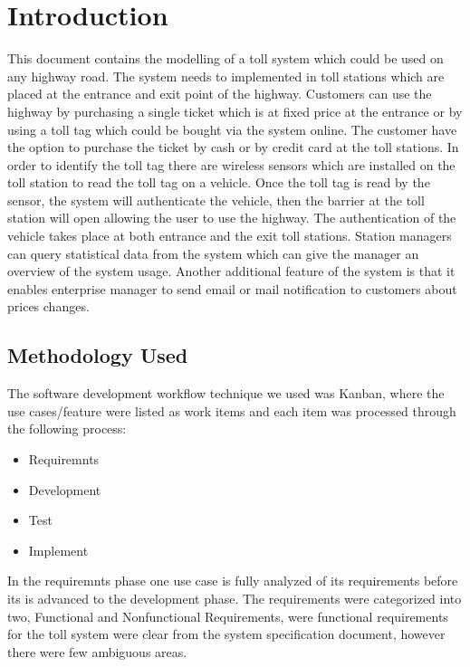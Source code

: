 \chapter{Introduction}
\noindent
This document contains the modelling of a toll system which could be used on any highway road. The system needs to implemented in toll stations which are placed at the entrance and exit point of the highway. Customers can use the highway by purchasing a single ticket which is at fixed price at the entrance or by using a toll tag which could be bought via the system online. The customer have the option to purchase the ticket by cash or by credit card at the toll stations. In order to identify the toll tag there are wireless sensors which are installed on the toll station to read the toll tag on a vehicle. Once the toll tag is read by the sensor, the system will authenticate the vehicle, then the barrier at the toll station will open allowing the user to use the highway. The authentication of the vehicle takes place at both entrance and the exit toll stations. Station managers can query statistical data from the system which can give the manager an overview of the system usage. Another additional feature of the system is that it enables enterprise manager to send email or mail notification to customers about prices changes.
\section{Methodology Used}

The software development workflow technique we used was Kanban, where the use cases/feature were listed as work items and each item was processed through the following process:

\begin{itemize}
  \item Requiremnts 
  \item Development
  \item Test
  \item Implement
\end{itemize}


In the requiremnts phase one use case is fully analyzed of its requirements before its is advanced to the development phase. The requirements were categorized into two, Functional and Nonfunctional Requirements, were functional requirements for the toll system were clear from the system specification document, however there were few ambiguous areas. 

